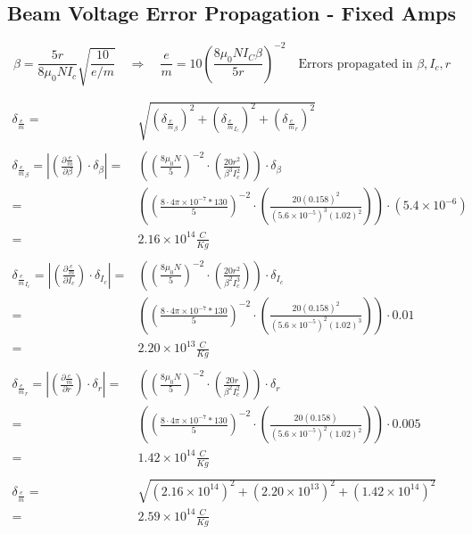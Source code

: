 \documentclass[12pt]{article}
\newcommand{\paren}[1]{\left( {#1} \right)}
\newcommand{\abs}[1]{\left| {#1} \right|}
\begin{document}
\clearpage

\subsection{Beam Voltage Error Propagation - Fixed Amps} \label{sec:FixedAmpsErr}

\begin{equation}
	\beta = \frac{5r}{8\mu_0N I_c}\sqrt{\frac{10}{e/m}}
	\quad \Rightarrow \quad
	\frac{e}{m}=10\paren{\frac{8\mu_0N I_C\beta}{5r}}^{-2}
	\quad \text{Errors propagated in }\beta, I_c, r
	\label{em_derive_FixA}
\end{equation}

\begin{align*}
	\delta_\frac{e}{m}=&\sqrt{\paren{\delta_{\frac{e}{m}_\beta}}^2+\paren{\delta_{\frac{e}{m}_{I_c}}}^2+\paren{\delta_{\frac{e}{m}_r}}^2} \\ \\
	\delta_{\frac{e}{m}_\beta} = \abs{\paren{\frac{\partial \frac{e}{m}}{\partial \beta}}\cdot\delta_\beta} =& \paren{\paren{\frac{8\mu_0N}{5}}^{-2}\cdot\paren{\frac{20r^2}{\beta^3I_c^2}}}\cdot\delta_\beta \\
	=& \paren{\paren{\frac{8\cdot4\pi\times10^{-7}*130}{5}}^{-2}\cdot\paren{\frac{20(0.158)^2}{(5.6\times10^{-5})^3(1.02)^2}}}\cdot(5.4\times10^{-6}) \\
	=& 2.16\times10^{14} \frac{C}{Kg} \\ \\
	\delta_{\frac{e}{m}_{I_c}} = \abs{\paren{\frac{\partial \frac{e}{m}}{\partial I_c}}\cdot\delta_{I_c}} =& \paren{\paren{\frac{8\mu_0N}{5}}^{-2}\cdot\paren{\frac{20r^2}{\beta^2I_c^3}}}\cdot \delta_{I_c} \\
	=& \paren{\paren{\frac{8\cdot4\pi\times10^{-7}*130}{5}}^{-2}\cdot\paren{\frac{20(0.158)^2}{(5.6\times10^{-5})^2(1.02)^3}}}\cdot0.01\\
	=& 2.20\times10^{13} \frac{C}{Kg} \\ \\
	\delta_{\frac{e}{m}_r} = \abs{\paren{\frac{\partial \frac{e}{m}}{\partial r}}\cdot\delta_r} =& \paren{\paren{\frac{8\mu_0N}{5}}^{-2}\cdot\paren{\frac{20r}{\beta^2I_c^2}}}\cdot \delta_r \\
	=& \paren{\paren{\frac{8\cdot4\pi\times10^{-7}*130}{5}}^{-2}\cdot\paren{\frac{20(0.158)}{(5.6\times10^{-5})^2(1.02)^2}}}\cdot0.005 \\
	=& 1.42\times10^{14} \frac{C}{Kg} \\ \\
	\delta_\frac{e}{m} =& \sqrt{(2.16\times10^{14})^2+(2.20\times10^{13})^2+(1.42\times10^{14})^2} \\
	=& 2.59\times10^{14} \frac{C}{Kg}
\end{align*}
\end{document}
